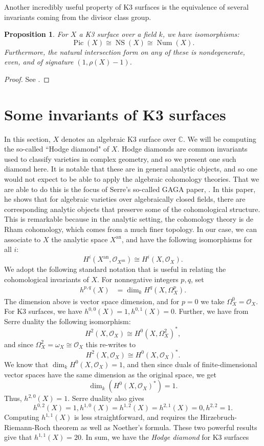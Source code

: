 \documentclass[12pt,twoside]{reedthesis}
\theoremstyle{plain}
\newtheorem{proposition}[theorem]{Proposition}
\theoremstyle{definition}
\theoremstyle{remark}
\newcommand{\CC}{\mathbb{C}}
\newcommand{\calO}{\mathcal{O}}
\newcommand{\Pic}{\operatorname{Pic}}
\newcommand{\NS}{\operatorname{NS}}
\newcommand{\Num}{\operatorname{Num}}
\begin{document}
Another incredibly useful property of K3 surfaces is the equivalence of several invariants coming from the divisor class group.
\begin{proposition}
For $X$ a K3 surface over a field $k$, we have isomorphisms:
\[
\Pic(X)\cong\NS(X)\cong\Num(X).
\]
Furthermore, the natural intersection form on any of these is nondegenerate, even, and of signature $(1,\rho(X)-1)$.
\end{proposition}
\begin{proof}
See \cite[Proposition 1.2.4]{huybrechts}.
\end{proof}

\section{Some invariants of K3 surfaces}\label{HodgeDK3}
In this section, $X$ denotes an algebraic K3 surface over $\CC$. We will be computing the so-called ``Hodge diamond" of $X$. Hodge diamonds are common invariants used to classify varieties in complex geometry, and so we present one such diamond here. It is notable that these are in general analytic objects, and so one would not expect to be able to apply the algebraic cohomology theories. That we are able to do this is the focus of Serre's so-called GAGA paper, \cite{gaga}. In this paper, he shows that for algebraic varieties over algebraically closed fields, there are corresponding analytic objects that preserve some of the cohomological structure. This is remarkable because in the analytic setting, the cohomology theory is de Rham cohomology, which comes from a much finer topology. In our case, we can associate to $X$ the analytic space $X^{\text{an}}$, and have the following isomorphisms for all $i$:
\[
H^i(X^{\text{an}},\calO_{X^{\text{an}}})\cong H^i(X,\calO_X).
\] We adopt the following standard notation that is useful in relating the cohomological invariants of $X$. For nonnegative integers $p,q$, set
\begin{align*}
h^{p,q}(X)&=\dim_k H^q(X,\Omega_X^p).
\end{align*}
\noindent The dimension above is vector space dimension, and for $p=0$ we take $\Omega_X^0=\calO_X$. For K3 surfaces, we have $h^{0,0}(X)=1, h^{0,1}(X)=0.$ Further, we have from Serre duality the following isomorphism:
\[
H^2(X,\calO_X)\cong H^0(X,\Omega_X^2)^*,
\]
and since $\Omega_X^2=\omega_X\cong\calO_X$ this re-writes to
\[
H^2(X,\calO_X)\cong H^0(X,\calO_X)^*.
\]
We know that $\dim_kH^0(X,\calO_X)=1$, and then since duals of finite-dimensional vector spaces have the same dimension as the original space, we get \[\dim_k( H^0(X,\calO_X)^*)=1.\] Thus, $h^{2,0}(X)=1$. Serre duality also gives \[h^{0,2}(X)=1, h^{1,0}(X)=h^{1,2}(X)=h^{2,1}(X)=0, h^{2,2}=1.\] Computing $h^{1,1}(X)$ is less straightforward, and requires the Hirzebruch-Riemann-Roch theorem as well as Noether's formula. These two powerful results give that $h^{1,1}(X)=20$. In sum, we have the \emph{Hodge diamond} for K3 surfaces
\end{document}
